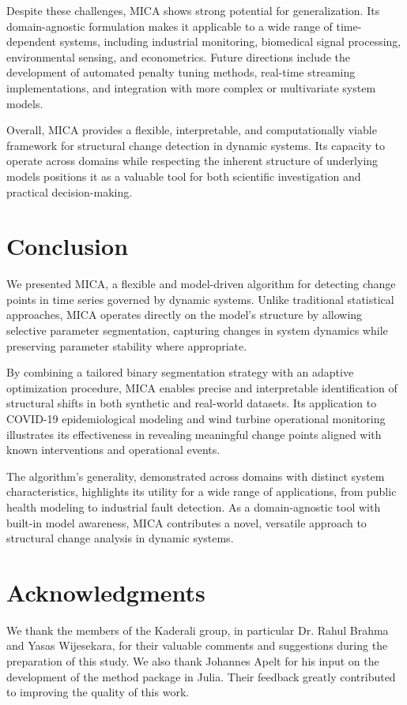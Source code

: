 \documentclass[10pt,letterpaper]{article}
\begin{document}
Despite these challenges, MICA shows strong potential for generalization. Its domain-agnostic formulation makes it applicable to a wide range of time-dependent systems, including industrial monitoring, biomedical signal processing, environmental sensing, and econometrics. Future directions include the development of automated penalty tuning methods, real-time streaming implementations, and integration with more complex or multivariate system models.

Overall, MICA provides a flexible, interpretable, and computationally viable framework for structural change detection in dynamic systems. Its capacity to operate across domains while respecting the inherent structure of underlying models positions it as a valuable tool for both scientific investigation and practical decision-making.



\section*{Conclusion}
We presented MICA, a flexible and model-driven algorithm for detecting change points in time series governed by dynamic systems. Unlike traditional statistical approaches, MICA operates directly on the model’s structure by allowing selective parameter segmentation, capturing changes in system dynamics while preserving parameter stability where appropriate.

By combining a tailored binary segmentation strategy with an adaptive optimization procedure, MICA enables precise and interpretable identification of structural shifts in both synthetic and real-world datasets. Its application to COVID-19 epidemiological modeling and wind turbine operational monitoring illustrates its effectiveness in revealing meaningful change points aligned with known interventions and operational events.

The algorithm's generality, demonstrated across domains with distinct system characteristics, highlights its utility for a wide range of applications, from public health modeling to industrial fault detection. As a domain-agnostic tool with built-in model awareness, MICA contributes a novel, versatile approach to structural change analysis in dynamic systems.

\section*{Acknowledgments}
We thank the members of the Kaderali group, in particular Dr. Rahul Brahma and Yasas Wijesekara, for their valuable comments and suggestions during the preparation of this study. We also thank Johannes Apelt for his input on the development of the method package in Julia. Their feedback greatly contributed to improving the quality of this work.  
\end{document}
